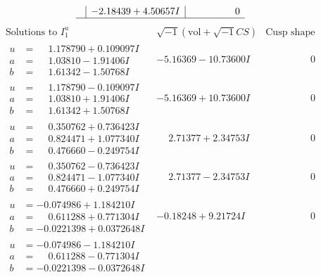 \documentclass[1p]{elsarticle_modified}
\theoremstyle{definition}
\newcommand{\I}{\sqrt{-1}}
\begin{document}
$$\begin{array}{c|c|c}
 & -2.18439 + 4.50657 I & \phantom{-0.000000 } 0\\
 \hline 
 \end{array}$$\newpage$$\begin{array}{c|c|c}  
\text{Solutions to }I^u_{1}& \I (\text{vol} + \sqrt{-1}CS) & \text{Cusp shape}\\
 \hline 
\begin{aligned}
u &= \phantom{-}1.178790 + 0.109097 I \\
a &= \phantom{-}1.03810 - 1.91406 I \\
b &= \phantom{-}1.61342 - 1.50768 I\end{aligned}
 & -5.16369 - 10.73600 I & \phantom{-0.000000 } 0 \\ \hline\begin{aligned}
u &= \phantom{-}1.178790 - 0.109097 I \\
a &= \phantom{-}1.03810 + 1.91406 I \\
b &= \phantom{-}1.61342 + 1.50768 I\end{aligned}
 & -5.16369 + 10.73600 I & \phantom{-0.000000 } 0 \\ \hline\begin{aligned}
u &= \phantom{-}0.350762 + 0.736423 I \\
a &= \phantom{-}0.824471 + 1.077340 I \\
b &= \phantom{-}0.476660 - 0.249754 I\end{aligned}
 & \phantom{-}2.71377 + 2.34753 I & \phantom{-0.000000 } 0 \\ \hline\begin{aligned}
u &= \phantom{-}0.350762 - 0.736423 I \\
a &= \phantom{-}0.824471 - 1.077340 I \\
b &= \phantom{-}0.476660 + 0.249754 I\end{aligned}
 & \phantom{-}2.71377 - 2.34753 I & \phantom{-0.000000 } 0 \\ \hline\begin{aligned}
u &= -0.074986 + 1.184210 I \\
a &= \phantom{-}0.611288 + 0.771304 I \\
b &= -0.0221398 + 0.0372648 I\end{aligned}
 & -0.18248 + 9.21724 I & \phantom{-0.000000 } 0 \\ \hline\begin{aligned}
u &= -0.074986 - 1.184210 I \\
a &= \phantom{-}0.611288 - 0.771304 I \\
b &= -0.0221398 - 0.0372648 I\end{aligned}

\end{array}$$
\end{document}
